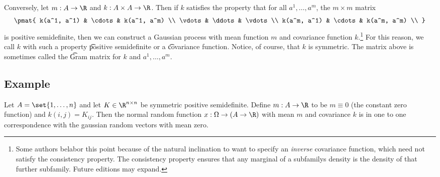 Conversely, let $m: A \to \R $ and $k: A \times A \to \R $.
Then if $k$ satisfies the property that for all $a^1, \dots , a^m$, the $m \times m$ matrix
      \[
\pmat{
k(a^1, a^1) & \cdots & k(a^1, a^m) \\
\vdots & \ddots & \vdots \\
k(a^m, a^1) & \cdots & k(a^m, a^m) \\
}
      \]
is positive semidefinite, then we can construct a Gaussian process with mean function $m$ and covariance function $k$.\footnote{Some authors belabor this point because of the natural inclination to want to specify an \textit{inverse} covariance function, which need not satisfy the consistency property. The consistency property ensures that any marginal of a subfamilys density is the density of that further subfamily. Future editions may expand.}
For this reason, we call $k$ with such a property \t{positive semidefinite} or a \t{covariance function}.
Notice, of course, that $k$ is symmetric.
The matrix above is sometimes called the \t{Gram matrix} for $k$ and $a^1, \dots , a^m$.

  \subsection*{Example}

Let $A = \set{1, \dots , n}$ and let $K \in \R ^{n \times n}$ be symmetric positive semidefinite.
Define $m: A \to \R $ to be $m \equiv 0$ (the constant zero function) and $k(i, j) = K_{ij}$.
Then the normal random function $x: \Omega  \to (A \to \R )$ with mean $m$ and covariance $k$ is in one to one correspondence with the gaussian random vectors with mean zero.


